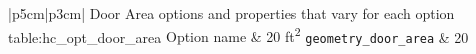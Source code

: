 \begin{customLongTable}{ |p{5cm}|p{3cm}| }
{Door Area options and properties that vary for each option} {table:hc_opt_door_area}
{Option name & 20 ft\textsuperscript{2}}
\endhead
\hline
\texttt{geometry\_door\_area} & 20 \\
\end{customLongTable}
